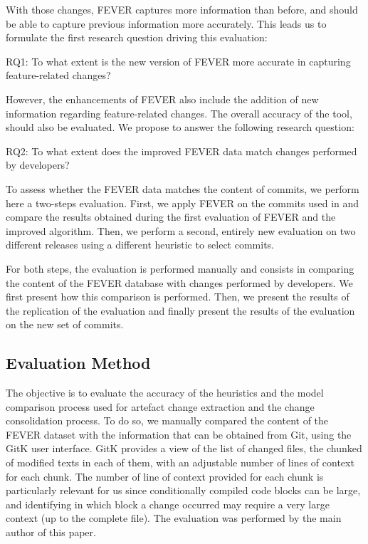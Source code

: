 With those changes, FEVER captures more information than before, and should be able
to capture previous information more accurately. 
This leads us to formulate the first research question driving this evaluation:
\begin{framed}
RQ1: To what extent is the new version of FEVER more accurate in capturing feature-related changes?
\end{framed}

However, the enhancements of FEVER also include the addition of new information regarding feature-related changes.
The overall accuracy of the tool, should also be evaluated. We propose to answer the following research question:
\begin{framed}
RQ2: To what extent does the improved FEVER data match changes performed by developers?
\end{framed}

To assess whether the FEVER data matches the content of commits, we perform here a two-steps evaluation. 
First, we apply FEVER on the commits used in \citep{dintzner_fever:_2016} and compare the results obtained
during the first evaluation of FEVER and the improved algorithm. 
Then, we perform a second, entirely new evaluation on two different releases using a different
heuristic to select commits.

For both steps, the evaluation is performed manually and consists in comparing the content of the FEVER database
with changes performed by developers.
We first present how this comparison is performed. Then, we present the results of the replication 
of the evaluation and finally present the results of the evaluation on the new set of commits. 

\subsection{Evaluation Method}

The objective is to evaluate the accuracy of the heuristics and the model comparison process used for artefact change extraction 
and the change consolidation process.
To do so,  we manually compared the content of the FEVER dataset with the information that can be obtained from Git, using the GitK user interface.
GitK provides a view of the list of changed files, the chunked of modified texts in each of them, with an adjustable number of lines of context for each chunk.
The number of line of context provided for each chunk is particularly relevant for us since conditionally compiled code blocks can be large, and identifying in which block a change occurred may require a very large context (up to the complete file).
The evaluation was performed by the main author of this paper.

